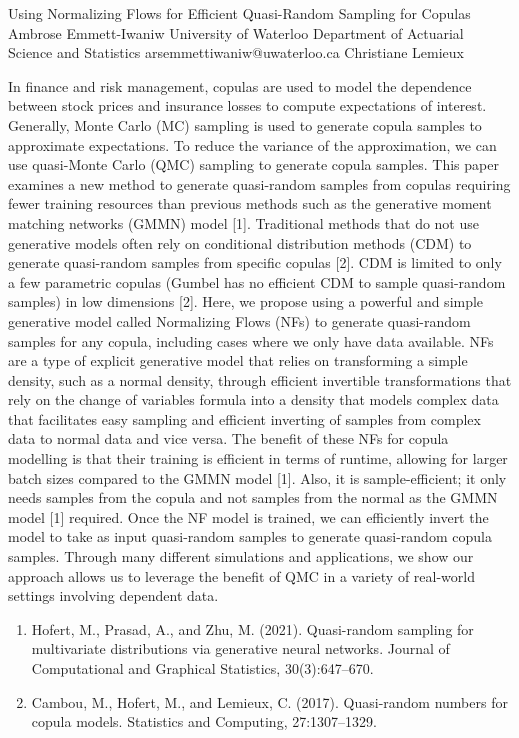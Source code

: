 \begin{talk}
  {Using Normalizing Flows for Efficient Quasi-Random Sampling for Copulas}%
  {Ambrose Emmett-Iwaniw}%
  {University of Waterloo Department of Actuarial Science and Statistics}%
  {arsemmettiwaniw@uwaterloo.ca}%
  {Christiane Lemieux}%
  
    
   
In finance and risk management, copulas are used to model the dependence between stock prices and insurance losses to compute expectations of interest. Generally, Monte Carlo (MC) sampling is used to generate copula samples to approximate expectations. To reduce the variance of the approximation, we can use quasi-Monte Carlo (QMC) sampling to generate copula samples. This paper examines a new method to generate quasi-random samples from copulas requiring fewer training resources than previous methods such as the generative moment matching networks (GMMN) model [1]. Traditional methods that do not use generative models often rely on conditional distribution methods (CDM) to generate quasi-random samples from specific copulas [2]. CDM is limited to only a few parametric copulas (Gumbel has no efficient CDM to sample quasi-random samples) in low dimensions [2]. Here, we propose using a powerful and simple generative model called Normalizing Flows (NFs) to generate quasi-random samples for any copula, including cases where we only have data available. NFs are a type of explicit generative model that relies on transforming a simple density, such as a normal density, through efficient invertible transformations that rely on the change of variables formula into a density that models complex data that facilitates easy sampling and efficient inverting of samples from complex data to normal data and vice versa. The benefit of these NFs for copula modelling is that their training is efficient in terms of runtime, allowing for larger batch sizes compared to the GMMN model [1]. Also, it is sample-efficient; it only needs samples from the copula and not samples from the normal as the GMMN model [1] required. Once the NF model is trained, we can efficiently invert the model to take as input quasi-random samples to generate quasi-random copula samples. Through many different simulations and applications, we show our approach allows us to leverage the benefit of QMC in a variety of real-world settings involving dependent data.
\medskip

\begin{enumerate}
 \item[{[1]}] Hofert, M., Prasad, A., and Zhu, M. (2021). Quasi-random sampling for multivariate distributions via generative neural networks. Journal of Computational and Graphical Statistics,
30(3):647--670.
 \item[{[2]}] Cambou, M., Hofert, M., and Lemieux, C. (2017). Quasi-random numbers for copula models. Statistics and Computing, 27:1307--1329. 
\end{enumerate}
\end{talk}

